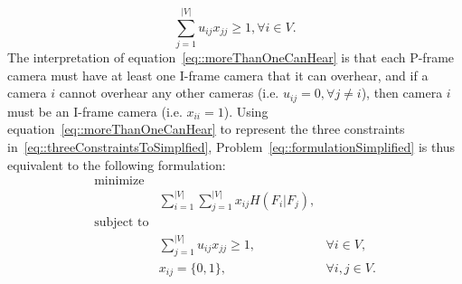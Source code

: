 \begin{equation}
\sum_{j=1}^{|V|} u_{ij} x_{jj} \geq 1, \forall i \in V.
\label{eq::moreThanOneCanHear}
\end{equation}
The interpretation of equation~\eqref{eq::moreThanOneCanHear} is that each P-frame camera must have at least one I-frame camera that it can overhear, and if a camera $i$ cannot overhear any other cameras (i.e. $u_{ij} = 0, \forall j \neq i$), then camera $i$ must be an I-frame camera (i.e. $x_{ii}=1$).
Using equation~\eqref{eq::moreThanOneCanHear} to represent the three constraints in~\eqref{eq::threeConstraintsToSimplfied}, Problem~\eqref{eq::formulationSimplified} is thus equivalent to the following formulation:
\begin{align}
\text{minimize} & & \nonumber \\
	&\sum_{i=1}^{|V|} \sum_{j=1}^{|V|}  x_{ij} H(F_i|F_j), & \nonumber \\
\text{subject to} & & \nonumber \\
	&\sum_{j=1}^{|V|} u_{ij} x_{jj} \geq 1, &\forall i \in V, \nonumber \\
	&x_{ij} = \{0,1\}, &\forall i,j \in V.
\label{eq::formulationSimplifiedAsGraph}
\end{align}

